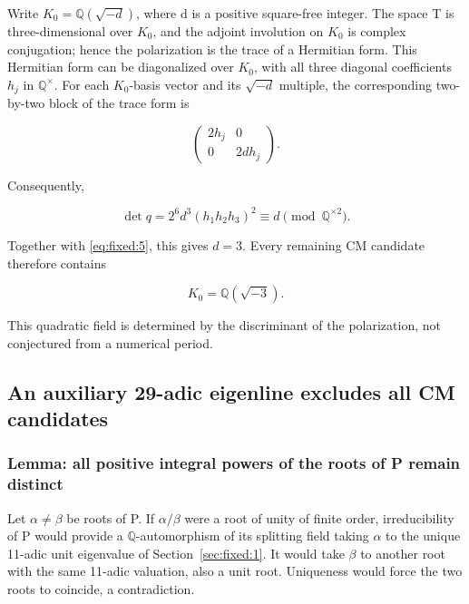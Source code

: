\documentclass[11pt,a4paper,oneside]{article}
\theoremstyle{plain}
\theoremstyle{definition}
\theoremstyle{remark}
\numberwithin{equation}{section}
\begin{document}
Write \(K_0=\mathbb Q(\sqrt{-d})\), where d is a positive square-free integer. The space T is three-dimensional over \(K_0\), and the adjoint involution on \(K_0\) is complex conjugation; hence the polarization is the trace of a Hermitian form. This Hermitian form can be diagonalized over \(K_0\), with all three diagonal coefficients \(h_j\) in \(\mathbb Q^\times\). For each \(K_0\)-basis vector and its \(\sqrt{-d}\) multiple, the corresponding two-by-two block of the trace form is

\begin{equation}
\begin{pmatrix}2h_j&0\\0&2dh_j\end{pmatrix}.
\end{equation}

Consequently,

\begin{equation}
\det q=2^6d^3(h_1h_2h_3)^2\equiv d
          \pmod{\mathbb Q^{\times2}}.
\end{equation}

Together with \eqref{eq:fixed:5}, this gives \(d=3\). Every remaining CM candidate therefore contains

\begin{equation}
K_0=\mathbb Q(\sqrt{-3}).              \label{eq:fixed:6}
\end{equation}

This quadratic field is determined by the discriminant of the polarization, not conjectured from a numerical period.


\subsection{An auxiliary 29-adic eigenline excludes all CM candidates}\label{sec:fixed:4}

\subsubsection{Lemma: all positive integral powers of the roots of P remain distinct}\label{ux5f15ux7406p-ux7684ux4efbux610fux6b63ux6574ux6570ux5e42ux8c31ux90fdux65e0ux91cdux590d}

Let \(\alpha\ne\beta\) be roots of P. If \(\alpha/\beta\) were a root of unity of finite order, irreducibility of P would provide a \(\mathbb Q\)-automorphism of its splitting field taking \(\alpha\) to the unique 11-adic unit eigenvalue of Section~\ref{sec:fixed:1}. It would take \(\beta\) to another root with the same 11-adic valuation, also a unit root. Uniqueness would force the two roots to coincide, a contradiction.
\end{document}
